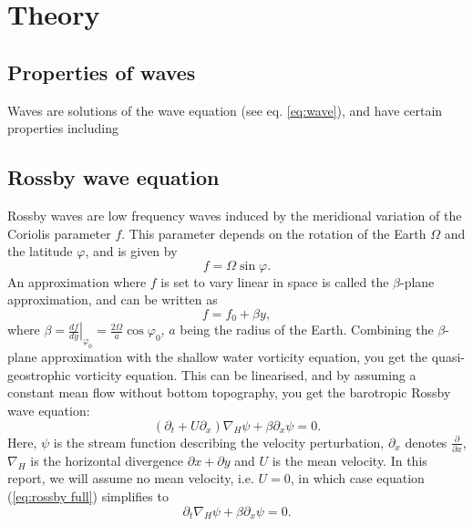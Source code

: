 \section{Theory}
\label{sec:theory}

\subsection{Properties of waves}
\label{sec:waves}
Waves are solutions of the wave equation (see eq. \ref{eq:wave}), and have certain properties including

\subsection{Rossby wave equation}
\label{sec:wave}
Rossby waves are low frequency waves induced by the meridional
variation of the Coriolis parameter $f$. This parameter depends on the rotation of the Earth $\Omega$ and the latitude $\varphi$, and is given by 
\begin{equation}
	f = \Omega \sin{\varphi}.
\end{equation} 
An approximation where $f$ is set to vary linear in space is called the $\beta$-plane approximation, and can be written as
\begin{equation}\label{beta-plane}
	f = f_0 + \beta y,
\end{equation} 
where $\beta = \left.\frac{df}{dy}\right|_{\varphi_0} = \frac{2\Omega}{a} \cos{\varphi_0}$, $a$ being the radius of the Earth. Combining the $\beta$-plane approximation with the shallow water vorticity equation, you get the quasi-geostrophic vorticity equation. This can be linearised, and by assuming a constant mean flow without bottom topography, you get the barotropic Rossby wave equation:
\begin{equation}\label{eq:rossby full}
	\left(\partial_t + U\partial_x \right) \nabla_H \psi + \beta \partial_x \psi = 0.
\end{equation}
Here, $\psi$ is the stream function describing the velocity perturbation, $\partial_x$ denotes $\frac{\partial}{\partial x}$, $\nabla_H$ is the horizontal divergence $\partial x + \partial y$ and $U$ is the mean velocity. In this report, we will assume no mean velocity, i.e. $U=0$, in which case equation (\ref{eq:rossby full}) simplifies to 
\begin{equation}\label{eq:rossby}
	\partial_t \nabla_H \psi + \beta \partial_x \psi = 0.
\end{equation}

